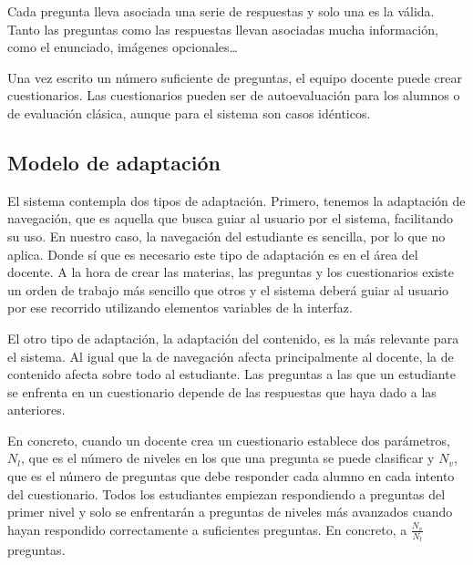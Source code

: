 Cada pregunta lleva asociada una serie de respuestas y solo una es la válida. Tanto las preguntas como las respuestas llevan asociadas mucha información, como el enunciado, imágenes opcionales\ldots

Una vez escrito un número suficiente de preguntas, el equipo docente puede crear cuestionarios. Las cuestionarios pueden ser de autoevaluación para los alumnos o de evaluación clásica, aunque para el sistema son casos idénticos.


\subsection{Modelo de adaptación\label{sec:modelo adapatacion}}

El sistema contempla dos tipos de adaptación. Primero, tenemos la adaptación de navegación, que es aquella que busca guiar al usuario por el sistema, facilitando su uso. En nuestro caso, la navegación del estudiante es sencilla, por lo que no aplica. Donde sí que es necesario este tipo de adaptación es en el área del docente. A la hora de crear las materias, las preguntas y los cuestionarios existe un orden de trabajo más sencillo que otros y el sistema deberá guiar al usuario por ese recorrido utilizando elementos variables de la interfaz.


El otro tipo de adaptación, la adaptación del contenido, es la más relevante para el sistema. Al igual que la de navegación afecta principalmente al docente, la de contenido afecta sobre todo al estudiante. Las preguntas a las que un estudiante se enfrenta en un cuestionario depende de las respuestas que haya dado a las anteriores.

En concreto, cuando un docente crea un cuestionario establece dos parámetros, $N_l$, que es el número de niveles en los que una pregunta se puede clasificar y $N_v$, que es el número de preguntas que debe responder cada alumno en cada intento del cuestionario. Todos los estudiantes empiezan respondiendo a preguntas del primer nivel y solo se enfrentarán a preguntas de niveles más avanzados cuando hayan respondido correctamente a suficientes preguntas. En concreto, a $\frac{N_v}{N_l}$ preguntas.

